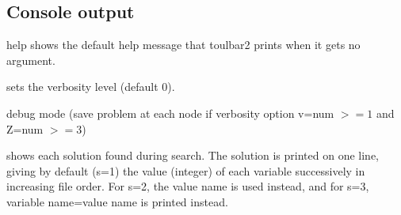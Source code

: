 \documentclass[letterpaper,10pt,openany,oneside,english]{sphinxmanual}
\begin{document}
\subsection{Console output}
\label{\detokenize{userdoc:console-output}}\begin{optionlist}{3cm}
\item [\sphinxhyphen{}help]  
\sphinxAtStartPar
shows the default help message that toulbar2 prints when
it gets no argument.
\end{optionlist}
\begin{description}
\sphinxAtStartPar
sets the verbosity level (default 0).

\sphinxAtStartPar
debug mode (save problem at each node if verbosity
option \sphinxhyphen{}v=num \(>= 1\) and \sphinxhyphen{}Z=num \(>=3\))

\sphinxAtStartPar
shows each solution found during search. The solution is
printed on one line, giving by default (\sphinxhyphen{}s=1) the value (integer)
of each variable successively
in increasing file order. For \sphinxhyphen{}s=2, the value name is used instead,
and for \sphinxhyphen{}s=3, variable name=value name is printed instead.

\end{description}
\end{document}
